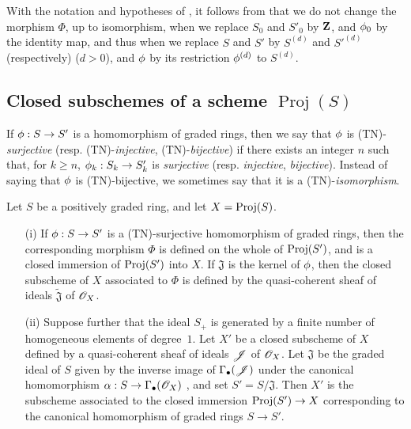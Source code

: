 \begin{env}[2.8.15]
\label{II.2.8.15}
With the notation and hypotheses of , it follows from  that we do not change the morphism $\Phi$, up to isomorphism, when we replace $S_0$ and $S'_0$ by $\mathbf{Z}$, and $\phi_0$ by the identity map, and thus when we replace $S$ and $S'$ by $S^{(d)}$ and ${S'}^{(d)}$ (respectively) ($d>0$), and $\phi$ by its restriction $\phi^{(d)}$ to $S^{(d)}$.
\end{env}


\subsection{Closed subschemes of a scheme $\operatorname{Proj}(S)$}
\label{subsection:II.2.9}

\begin{env}[2.9.1]
\label{II.2.9.1}
If $\vphi:S\to S'$ is a homomorphism of graded rings, then we say that $\phi$ is (TN)-\emph{surjective} (resp. (TN)-\emph{injective}, (TN)-\emph{bijective}) if there exists an integer $n$ such that, for $k\geq n$, $\vphi_k:S_k\to S'_k$ is \emph{surjective} (resp. \emph{injective}, \emph{bijective}).
Instead of saying that $\phi$ is (TN)-bijective, we sometimes say that it is a (TN)-\emph{isomorphism}.
\end{env}

\begin{proposition}[2.9.2]
\label{II.2.9.2}
Let $S$ be a positively graded ring, and let $X=\operatorname{Proj}(S)$.
\begin{enumerate}
  \item[\rm{(i)}] If $\vphi:S\to S'$ is a (TN)-surjective homomorphism of graded rings, then the corresponding morphism $\Phi$  is defined on the whole of $\operatorname{Proj}(S')$, and is a closed immersion of $\operatorname{Proj}(S')$ into $X$.
    If $\mathfrak{J}$ is the kernel of $\phi$, then the closed subscheme of $X$ associated to $\Phi$ is defined by the quasi-coherent sheaf of ideals $\widetilde{\mathfrak{J}}$ of $\mathscr{O}_X$.
  \item[\rm{(ii)}] Suppose further that the ideal $S_+$ is generated by a finite number of homogeneous elements of degree~$1$.
    Let $X'$ be a closed subscheme of $X$ defined by a quasi-coherent sheaf of ideals $\mathscr{J}$ of $\mathscr{O}_X$.
    Let $\mathfrak{J}$ be the graded ideal of $S$ given by the inverse image of $\Gamma_\bullet(\mathscr{J})$ under the canonical homomorphism $\alpha:S\to\Gamma_\bullet(\sh{O}_X)$ , and set $S'=S/\mathfrak{J}$.
    Then $X'$ is the subscheme associated to the closed immersion $\Proj(S')\to X$ corresponding to the canonical homomorphism of graded rings $S\to S'$.
\end{enumerate}
\end{proposition}

